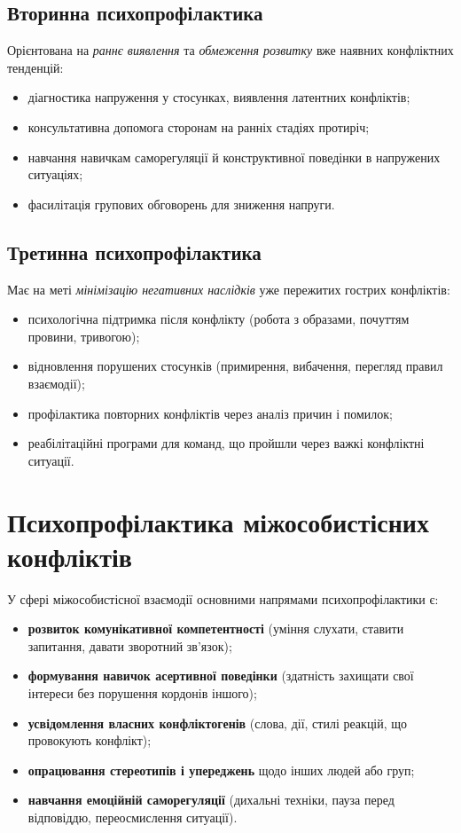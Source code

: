\documentclass[12pt,a4paper]{article}
\begin{document}
    \subsection*{Вторинна психопрофілактика}
    Орієнтована на \textit{раннє виявлення} та \textit{обмеження розвитку} вже наявних конфліктних тенденцій:
    \begin{itemize}
        \item діагностика напруження у стосунках, виявлення латентних конфліктів;
        \item консультативна допомога сторонам на ранніх стадіях протиріч;
        \item навчання навичкам саморегуляції й конструктивної поведінки в напружених ситуаціях;
        \item фасилітація групових обговорень для зниження напруги.
    \end{itemize}

    \subsection*{Третинна психопрофілактика}
    Має на меті \textit{мінімізацію негативних наслідків} уже пережитих гострих конфліктів:
    \begin{itemize}
        \item психологічна підтримка після конфлікту (робота з образами, почуттям провини, тривогою);
        \item відновлення порушених стосунків (примирення, вибачення, перегляд правил взаємодії);
        \item профілактика повторних конфліктів через аналіз причин і помилок;
        \item реабілітаційні програми для команд, що пройшли через важкі конфліктні ситуації.
    \end{itemize}

    \section*{Психопрофілактика міжособистісних конфліктів}
    У сфері міжособистісної взаємодії основними напрямами психопрофілактики є:
    \begin{itemize}
        \item \textbf{розвиток комунікативної компетентності} (уміння слухати, ставити запитання, давати зворотний зв’язок);
        \item \textbf{формування навичок асертивної поведінки} (здатність захищати свої інтереси без порушення кордонів іншого);
        \item \textbf{усвідомлення власних конфліктогенів} (слова, дії, стилі реакцій, що провокують конфлікт);
        \item \textbf{опрацювання стереотипів і упереджень} щодо інших людей або груп;
        \item \textbf{навчання емоційній саморегуляції} (дихальні техніки, пауза перед відповіддю, переосмислення ситуації).
    \end{itemize}
\end{document}
